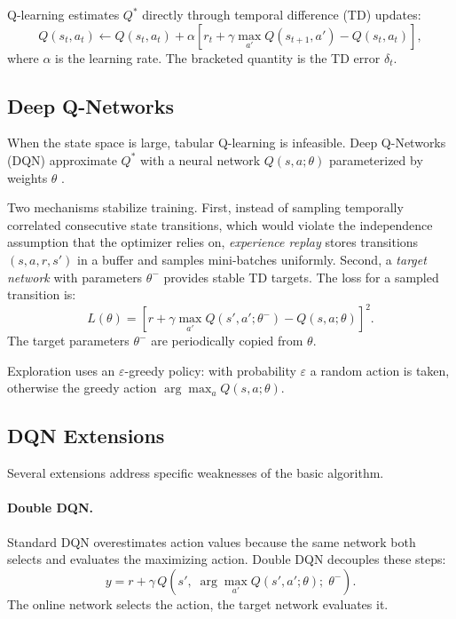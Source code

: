 \documentclass[12pt,a4paper,titlepage]{article}
\begin{document}
Q-learning estimates $Q^*$ directly through temporal difference (TD) updates:
\begin{equation}
Q(s_t, a_t) \leftarrow Q(s_t, a_t) + \alpha\!\left[r_t + \gamma \max_{a'} Q(s_{t+1}, a') - Q(s_t, a_t)\right],
\end{equation}
where $\alpha$ is the learning rate. The bracketed quantity is the TD error $\delta_t$.

\subsection{Deep Q-Networks}

When the state space is large, tabular Q-learning is infeasible. Deep Q-Networks (DQN) approximate $Q^*$ with a neural network $Q(s, a; \theta)$ parameterized by weights $\theta$ \citep{Mnih2013, Mnih2015}.

Two mechanisms stabilize training. First, instead of sampling temporally correlated consecutive state transitions, which would violate the independence assumption that the optimizer relies on, \emph{experience replay} stores transitions $(s, a, r, s')$ in a buffer and samples mini-batches uniformly. Second, a \emph{target network} with parameters $\theta^-$ provides stable TD targets. The loss for a sampled transition is:
\begin{equation}
L(\theta) = \left[r + \gamma \max_{a'} Q(s', a'; \theta^-) - Q(s, a; \theta)\right]^2.
\end{equation}
The target parameters $\theta^-$ are periodically copied from $\theta$.

Exploration uses an $\varepsilon$-greedy policy: with probability $\varepsilon$ a random action is taken, otherwise the greedy action $\arg\max_a Q(s, a; \theta)$.

\subsection{DQN Extensions}
\label{sec:dqn_extensions}

Several extensions address specific weaknesses of the basic algorithm.

\paragraph{Double DQN.} Standard DQN overestimates action values because the same network both selects and evaluates the maximizing action. Double DQN \citep{vanHasselt2016} decouples these steps:
\begin{equation}
y = r + \gamma\, Q\!\left(s',\; \arg\max_{a'} Q(s', a'; \theta);\; \theta^-\right).
\end{equation}
The online network selects the action, the target network evaluates it.
\end{document}
